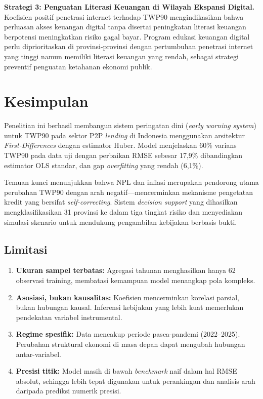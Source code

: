 \documentclass[12pt,a4paper]{article}
\begin{document}
\textbf{Strategi 3: Penguatan Literasi Keuangan di Wilayah Ekspansi Digital.} Koefisien positif penetrasi internet terhadap TWP90 mengindikasikan bahwa perluasan akses keuangan digital tanpa disertai peningkatan literasi keuangan berpotensi meningkatkan risiko gagal bayar. Program edukasi keuangan digital perlu diprioritaskan di provinsi-provinsi dengan pertumbuhan penetrasi internet yang tinggi namun memiliki literasi keuangan yang rendah, sebagai strategi preventif penguatan ketahanan ekonomi publik.

\section{Kesimpulan}

Penelitian ini berhasil membangun sistem peringatan dini (\textit{early warning system}) untuk TWP90 pada sektor P2P \textit{lending} di Indonesia menggunakan arsitektur \textit{First-Differences} dengan estimator Huber. Model menjelaskan 60\% varians TWP90 pada data uji dengan perbaikan RMSE sebesar 17,9\% dibandingkan estimator OLS standar, dan gap \textit{overfitting} yang rendah (6,1\%).

Temuan kunci menunjukkan bahwa NPL dan inflasi merupakan pendorong utama perubahan TWP90 dengan arah negatif---mencerminkan mekanisme pengetatan kredit yang bersifat \textit{self-correcting}. Sistem \textit{decision support} yang dihasilkan mengklasifikasikan 31 provinsi ke dalam tiga tingkat risiko dan menyediakan simulasi skenario untuk mendukung pengambilan kebijakan berbasis bukti.

\subsection{Limitasi}

\begin{enumerate}
\item \textbf{Ukuran sampel terbatas:} Agregasi tahunan menghasilkan hanya 62 observasi training, membatasi kemampuan model menangkap pola kompleks.
\item \textbf{Asosiasi, bukan kausalitas:} Koefisien mencerminkan korelasi parsial, bukan hubungan kausal. Inferensi kebijakan yang lebih kuat memerlukan pendekatan variabel instrumental.
\item \textbf{Regime spesifik:} Data mencakup periode pasca-pandemi (2022--2025). Perubahan struktural ekonomi di masa depan dapat mengubah hubungan antar-variabel.
\item \textbf{Presisi titik:} Model masih di bawah \textit{benchmark} naif dalam hal RMSE absolut, sehingga lebih tepat digunakan untuk perankingan dan analisis arah daripada prediksi numerik presisi.
\end{enumerate}
\end{document}
